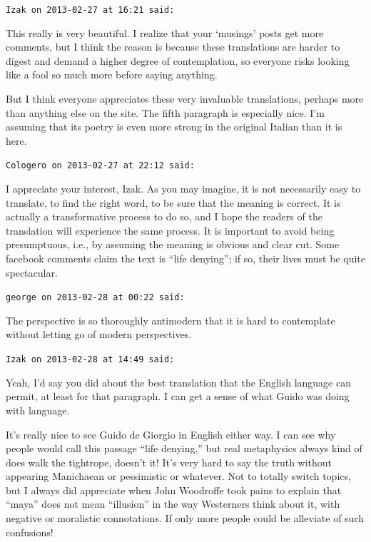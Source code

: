 \begin{footnotesize}
\begin{sffamily}
\texttt{Izak on 2013-02-27 at 16:21 said:}

This really is very beautiful. I realize that your `musings' posts get more comments, but I think the reason is because these translations are harder to digest and demand a higher degree of contemplation, so everyone risks looking like a fool so much more before saying anything.

But I think everyone appreciates these very invaluable translations, perhaps more than anything else on the site. The fifth paragraph is especially nice. I'm assuming that its poetry is even more strong in the original Italian than it is here.

\hfill

\texttt{Cologero on 2013-02-27 at 22:12 said:}

I appreciate your interest, Izak. As you may imagine, it is not necessarily easy to translate, to find the right word, to be sure that the meaning is correct. It is actually a transformative process to do so, and I hope the readers of the translation will experience the same process. It is important to avoid being presumptuous, i.e., by assuming the meaning is obvious and clear cut. Some facebook comments claim the text is ``life denying''; if so, their lives must be quite spectacular.

\hfill

\texttt{george on 2013-02-28 at 00:22 said:}

The perspective is so thoroughly antimodern that it is hard to contemplate without letting go of modern perspectives.

\hfill

\texttt{Izak on 2013-02-28 at 14:49 said:}

Yeah, I'd say you did about the best translation that the English language can permit, at least for that paragraph. I can get a sense of what Guido was doing with language.

It's really nice to see Guido de Giorgio in English either way. I can see why people would call this passage ``life denying,'' but real metaphysics always kind of does walk the tightrope, doesn't it! It's very hard to say the truth without appearing Manichaean or pessimistic or whatever. Not to totally switch topics, but I always did appreciate when John Woodroffe took pains to explain that ``maya'' does not mean ``illusion'' in the way Westerners think about it, with negative or moralistic connotations. If only more people could be alleviate of such confusions!


\end{sffamily}
\end{footnotesize}
